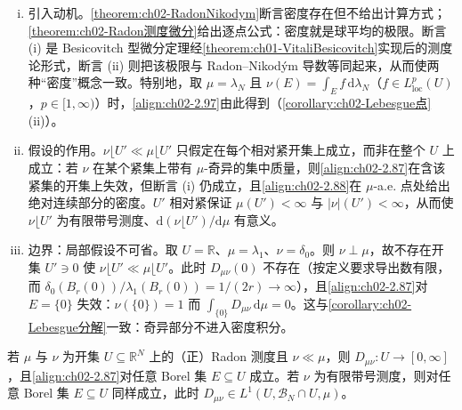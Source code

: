 \documentclass[../../main.tex]{subfiles}%
\begin{document}
\begin{remark}\label{remark:ch02-Radon测度微分}
\begin{enumerate}[(i)]
\item 引入动机。\cref{theorem:ch02-RadonNikodym}断言密度存在但不给出计算方式；\cref{theorem:ch02-Radon测度微分}给出逐点公式：密度就是球平均的极限。断言 (i) 是 Besicovitch 型微分定理经\cref{theorem:ch01-VitaliBesicovitch}实现后的测度论形式，断言 (ii) 则把该极限与 Radon--Nikodým 导数等同起来，从而使两种“密度”概念一致。特别地，取 $\mu=\lambda_N$ 且 $\nu(E)=\int_Ef\,\mathrm{d}\lambda_N$（$f\in L^p_{\mathrm{loc}}(U)$，$p\in[1,\infty)$）时，\eqref{align:ch02-2.97}由此得到（\cref{corollary:ch02-Lebesgue点}(ii)）。
\item 假设的作用。$\nu\lfloor U'\ll\mu\lfloor U'$ 只假定在每个相对紧开集上成立，而非在整个 $U$ 上成立：若 $\nu$ 在某个紧集上带有 $\mu$-奇异的集中质量，则\eqref{align:ch02-2.87}在含该紧集的开集上失效，但断言 (i) 仍成立，且\eqref{align:ch02-2.88}在 $\mu$-a.e. 点处给出绝对连续部分的密度。$U'$ 相对紧保证 $\mu(U')<\infty$ 与 $|\nu|(U')<\infty$，从而使 $\nu\lfloor U'$ 为有限带号测度、$\mathrm{d}(\nu\lfloor U')/\mathrm{d}\mu$ 有意义。
\item 边界：局部假设不可省。取 $U=\mathbb{R}$、$\mu=\lambda_1$、$\nu=\delta_0$。则 $\nu\perp\mu$，故不存在开集 $U'\ni0$ 使 $\nu\lfloor U'\ll\mu\lfloor U'$。此时 $D_{\mu\nu}(0)$ 不存在（按定义要求导出数有限，而 $\delta_0(B_r(0))/\lambda_1(B_r(0))=1/(2r)\to\infty$），且\eqref{align:ch02-2.87}对 $E=\{0\}$ 失效：$\nu(\{0\})=1$ 而 $\int_{\{0\}}D_{\mu\nu}\,\mathrm{d}\mu=0$。这与\cref{corollary:ch02-Lebesgue分解}一致：奇异部分不进入密度积分。
\end{enumerate}
\end{remark}

\begin{remark}\label{remark:ch02-RN绝对连续}
若 $\mu$ 与 $\nu$ 为开集 $U\subseteq\mathbb R^N$ 上的（正）Radon 测度且 $\nu\ll\mu$，则 $D_{\mu\nu}:U\to[0,\infty]$，且\eqref{align:ch02-2.87}对任意 Borel 集 $E\subseteq U$ 成立。若 $\nu$ 为有限带号测度，则对任意 Borel 集 $E\subseteq U$ 同样成立，此时 $D_{\mu\nu}\in L^1(U,\mathscr B_N\cap U,\mu)$。
\end{remark}
\end{document}

